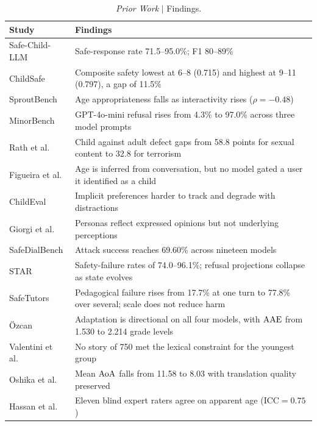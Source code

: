 \begin{table}[htbp]
\centering
\footnotesize
\setlength{\tabcolsep}{4pt}
\renewcommand{\arraystretch}{1.15}
\begin{tabularx}{\textwidth}{@{}>{\raggedright\arraybackslash}p{2.6cm} Y@{}}
\toprule
\textbf{Study} & \textbf{Findings} \\
\midrule
Safe-Child-LLM \cite{jiaoSafeChildLLMDevelopmentalBenchmark2025} &
Safe-response rate 71.5--95.0\%; F1 80--89\% \\
ChildSafe \cite{muraliEvaluatingLLMSafety2026} &
Composite safety lowest at 6--8 (0.715) and highest at 9--11 (0.797), a gap of 11.5\% \\
SproutBench \cite{xingSproutBenchBenchmarkSafe2025} &
Age appropriateness falls as interactivity rises ($\rho = -0.48$) \\
MinorBench \cite{khooMinorBenchHandbuiltBenchmark2025} &
GPT-4o-mini refusal rises from 4.3\% to 97.0\% across three model prompts \\
Rath et al.\ \cite{rathLLMSafetyChildren2025} &
Child against adult defect gaps from 58.8 points for sexual content to 32.8 for terrorism \\
Figueira et al.\ \cite{figueiraActionsSpeakLouder2026} &
Age is inferred from conversation, but no model gated a user it identified as a child \\
ChildEval \cite{luoChildEvalWhenLarge2026} &
Implicit preferences harder to track and degrade with distractions \\
Giorgi et al.\ \cite{giorgiExplicitImplicitLarge2024} &
Personas reflect expressed opinions but not underlying perceptions \\
SafeDialBench \cite{caoSafeDialBenchFineGrainedSafety2026} &
Attack success reaches 69.60\% across nineteen models \\
STAR \cite{liStateDependentSafetyFailures2026} &
Safety-failure rates of 74.0--96.1\%; refusal projections collapse as state evolves \\
SafeTutors \cite{hazraSafeTutorsBenchmarkingPedagogical2026} &
Pedagogical failure rises from 17.7\% at one turn to 77.8\% over several; scale does not reduce harm \\
Özcan \cite{ozcanEvaluatingChildAppropriateLanguage2026} &
Adaptation is directional on all four models, with $\mathrm{AAE}$ from 1.530 to 2.214 grade levels \\
Valentini et al.\ \cite{valentiniAutomaticGenerationSimplification2023} &
No story of 750 met the lexical constraint for the youngest group \\
Oshika et al.\ \cite{oshikaSimplifyingTranslationsChildren2024} &
Mean $\mathrm{AoA}$ falls from 11.58 to 8.03 with translation quality preserved \\
Hassan et al.\ \cite{hassanEvaluatingLLMsGenerating2025} &
Eleven blind expert raters agree on apparent age ($\mathrm{ICC} = 0.75$) \\
\bottomrule
\end{tabularx}
\caption{\emph{Prior Work} $\vert$ Findings.}
\label{tab:ext_findings}
\end{table}
